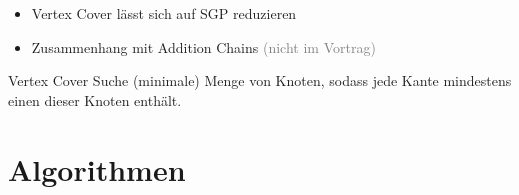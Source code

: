 \documentclass[xcolor=dvipsnames]{beamer}
\begin{document}
\begin{frame}{\secname}
\begin{itemize}[<+->]
	\item Vertex Cover lässt sich auf SGP reduzieren
	\item Zusammenhang mit Addition Chains \textcolor{gray}{(nicht im Vortrag)}
\end{itemize}
\end{frame}

\begin{frame}{\secname}
\begin{block}{Vertex Cover}
	\Gap
	Suche (minimale) Menge von Knoten, sodass jede Kante mindestens einen dieser Knoten enthält.\linebreak
	$ $\linebreak
	
	
	
	
\end{block}
\end{frame}

\section{Algorithmen}
	
\end{document}
